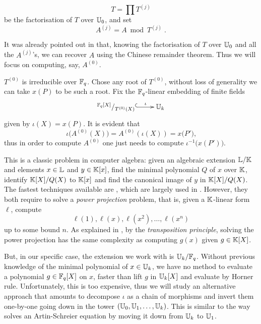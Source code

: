 \begin{equation}
  \label{eq:T}
  T = \prod T^{(j)}
\end{equation}
be the factorisation of $T$ over $\mathbb{U}_0$, and set
\begin{equation}
  \label{eq:A}
  A^{(j)} = A \bmod T^{(j)}
  \;\text{.}
\end{equation}

It was already pointed out in \cite[$\S$2.3]{Cou96} that, knowing the
factorisation of $T$ over $\mathbb{U}_0$ and all the $A^{(j)}$'s, we can
recover $A$ using the Chinese remainder theorem. Thus we will focus on
computing, say, $A^{(0)}$.

$T^{(0)}$ is irreducible over $\mathbb{F}_q$. Chose any root of $T^{(0)}$,
without loss of generality we can take $x(P)$ to be such a root.  Fix
the $\mathbb{F}_q$-linear embedding of finite fields
\begin{equation}
  \label{eq:embed}
  \xymatrix{
    ^{\F_q[X]}/_{T^{(0)}(X)} \ar@{^{(}->}[r]^-\iota & \U_k
  }
\end{equation}
given by $\iota(X) = x(P)$. It is evident that
\begin{equation}
  \iota\bigl(A^{(0)}(X)\bigr) = A^{(0)}\left(\iota(X)\right)=x\bigl(P'\bigr)
  \text{,}
\end{equation}
thus in order to compute $A^{(0)}$ one just needs to compute
$\iota^{-1}\bigl(x(P')\bigr)$.

This is a classic problem in computer algebra: given an algebraic
extension $\mathbb{L}/\mathbb{K}$ and elements $x\in\mathbb{L}$ and $y\in\mathbb{K}[x]$, find the
minimal polynomial $Q$ of $x$ over $\mathbb{K}$, identify $\mathbb{K}[X]/Q(X)$ to
$\mathbb{K}[x]$ and find the canonical image of $y$ in $\mathbb{K}[X]/Q(X)$. The
fastest techniques available are \cite{shoup99,PS06}, which are largely
used in \cite{DFS09}. However, they both require to solve a
\emph{power projection} problem, that is, given a $\mathbb{K}$-linear form
$\ell$, compute
\begin{equation}
  \ell(1), \ell(x), \ell(x^2), \dots, \ell(x^n)
\end{equation}
up to some bound $n$. As explained in \cite{shoup99}, by the
\emph{transposition principle}, solving the power projection has the
same complexity as computing $g(x)$ given $g\in\mathbb{K}[X]$.

But, in our specific case, the extension we work with is $\mathbb{U}_k/\mathbb{F}_q$.
Without previous knowledge of the minimal polynomial of $x\in\mathbb{U}_k$, we
have no method to evaluate a polynomial $g\in\mathbb{F}_q[X]$ on $x$, faster
than lift $g$ in $\mathbb{U}_k[X]$ and evaluate by Horner rule. Unfortunately,
this is too expensive, thus we will study an alternative approach that
amounts to decompose $\iota$ as a chain of morphisms and invert them
one-by-one going down in the tower $(\mathbb{U}_0,\mathbb{U}_1,\ldots,\mathbb{U}_k)$. This is
similar to the way \cite{Cou00} solves an Artin-Schreier equation by
moving it down from $\mathbb{U}_k$ to $\mathbb{U}_1$.


